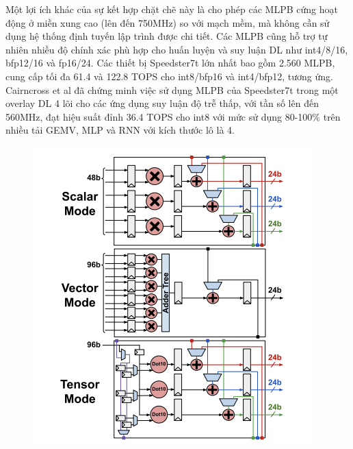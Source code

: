 \documentclass[a4paper]{article}
\begin{document}
Một lợi ích khác của sự kết hợp chặt chẽ này là cho phép các MLPB cứng hoạt động ở miền xung cao (lên đến 750MHz) so với mạch mềm, mà không cần sử dụng hệ thống định tuyến lập trình được chi tiết. Các MLPB cũng hỗ trợ tự nhiên nhiều độ chính xác phù hợp cho huấn luyện và suy luận DL như int4/8/16, bfp12/16 và fp16/24. Các thiết bị Speedster7t lớn nhất bao gồm 2.560 MLPB, cung cấp tối đa 61.4 và 122.8 TOPS cho int8/bfp16 và int4/bfp12, tương ứng. Cairncross et al đã chứng minh việc sử dụng MLPB của Speedster7t trong một overlay DL 4 lõi cho các ứng dụng suy luận độ trễ thấp, với tần số lên đến 560MHz, đạt hiệu suất đỉnh 36.4 TOPS cho int8 với mức sử dụng 80-100\% trên nhiều tải GEMV, MLP và RNN với kích thước lô là 4.
\begin{figure} [!h]
    \centering
    \includegraphics[width=0.75\linewidth]{assets/fpga_19.png}
    \label{fig:fpga_19}
\end{figure}
\end{document}

